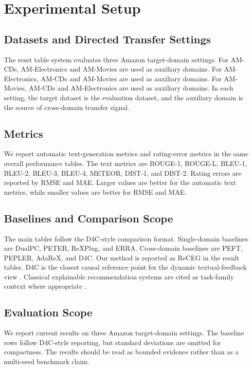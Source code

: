 \section{Experimental Setup}

\subsection{Datasets and Directed Transfer Settings}

The reset table system evaluates three Amazon target-domain settings. For
AM-CDs, AM-Electronics and AM-Movies are used as auxiliary domains. For
AM-Electronics, AM-CDs and AM-Movies are used as auxiliary domains. For
AM-Movies, AM-CDs and AM-Electronics are used as auxiliary domains. In each
setting, the target dataset is the evaluation dataset, and the auxiliary domain
is the source of cross-domain transfer signal.

\subsection{Metrics}

We report automatic text-generation metrics and rating-error metrics in the
same overall performance tables. The text metrics are ROUGE-1, ROUGE-L, BLEU-1,
BLEU-2, BLEU-3, BLEU-4, METEOR, DIST-1, and DIST-2. Rating errors are reported
by RMSE and MAE. Larger values are better for the automatic text metrics, while
smaller values are better for RMSE and MAE.

\subsection{Baselines and Comparison Scope}

The main tables follow the D4C-style comparison format. Single-domain
baselines are DualPC, PETER, ReXPlug, and ERRA. Cross-domain baselines are
PEFT, PEPLER, AdaReX, and D4C. Our method is reported as ReCEG in the result
tables. D4C is the closest causal reference point for the dynamic
textual-feedback view \cite{d4c}. Classical explainable recommendation systems
are cited as task-family context where appropriate \cite{peter,pepler,adarex}.

\subsection{Evaluation Scope}

We report current results on three Amazon target-domain settings. The baseline
rows follow D4C-style reporting, but standard deviations are omitted for
compactness. The results should be read as bounded evidence rather than as a
multi-seed benchmark claim.
